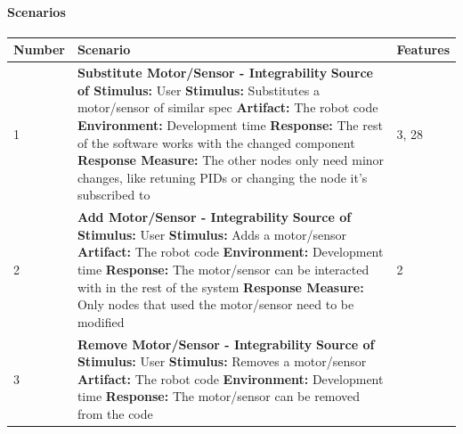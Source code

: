 \documentclass{fank1basedocument}
\begin{document}
\paragraph{Scenarios}
\begin{center}
	\begin{tabular}{|p{}|>{\raggedright\arraybackslash}p{}|p{}|}
		\hline
		\textbf{Number} & \textbf{Scenario} & \textbf{Features}\\
		\hline
		1 & \large{\textbf{Substitute Motor/Sensor - Integrability}}\newline
				\textbf{Source of Stimulus:} User\newline
				\textbf{Stimulus:} Substitutes a motor/sensor of similar spec\newline
				\textbf{Artifact:} The robot code\newline
				\textbf{Environment:} Development time\newline
				\textbf{Response:} The rest of the software works with the changed component\newline
				\textbf{Response Measure:} The other nodes only need minor changes, like retuning PIDs or changing the node it’s subscribed to
			& 3, 28\\
		\hline
		2 & \large{\textbf{Add Motor/Sensor - Integrability}}\newline
				\textbf{Source of Stimulus:} User\newline
				\textbf{Stimulus:} Adds a motor/sensor\newline
				\textbf{Artifact:} The robot code\newline
				\textbf{Environment:} Development time\newline
				\textbf{Response:} The motor/sensor can be interacted with in the rest of the system\newline
				\textbf{Response Measure:} Only nodes that used the motor/sensor need to be modified
			& 2\\
		\hline
		3 & \large{\textbf{Remove Motor/Sensor - Integrability}}\newline
				\textbf{Source of Stimulus:} User\newline
				\textbf{Stimulus:} Removes a motor/sensor\newline
				\textbf{Artifact:} The robot code\newline
				\textbf{Environment:} Development time\newline
				\textbf{Response:} The motor/sensor can be removed from the code\newline

\end{tabular}
\end{center}
\end{document}
